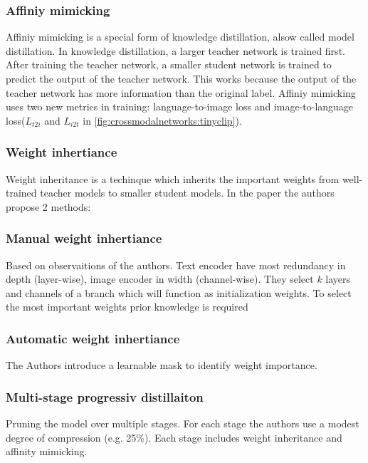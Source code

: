         \subsubsection{Affiniy mimicking}
        Affiniy mimicking is a special form of knowledge distillation\cite{knowledgedistillation}, alsow called model distillation.
        In knowledge distillation, a larger teacher network is trained first.
        After training the teacher network, a smaller student network is trained to predict the output of the teacher network.
        This works because the output of the teacher network has more information than the original label.
        Affiniy mimicking uses two new metrics in training: language-to-image loss and image-to-language loss(\(L_{t2i}\) and \(L_{i2t}\) in \cref{fig:crossmodalnetworks:tinyclip}).

        \subsubsection{Weight inhertiance}
        Weight inheritance is a techinque which inherits the important weights from well-trained teacher models to smaller student models.
        In the paper the authors propose 2 methods:

        \subsubsection{Manual weight inhertiance}
        Based on observaitions of the authors.
        Text encoder have most redundancy in depth (layer-wise), image encoder in width (channel-wise).
        They select \(k\) layers and channels of a branch which will function as initialization weights.
        To select the most important weights prior knowledge is required

        \subsubsection{Automatic weight inhertiance}
        The Authors introduce a learnable mask to identify weight importance.

        \subsubsection{Multi-stage progressiv distillaiton}
        Pruning the model over multiple stages.
        For each stage the authors use a modest degree of compression (e.g. 25\%). Each stage includes weight inheritance and affinity mimicking.

